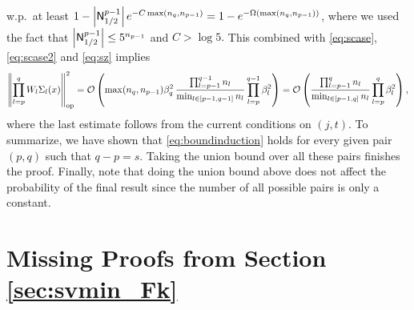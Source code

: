 \documentclass[11pt]{article}
\newcommand{\bigO}[1]{\mathcal{O}\left(#1\right)}
\newcommand{\bigOmg}[1]{\Omega\left(#1\right)}
\newcommand{\norm}[1]{\left\|#1\right\|}
\newcommand{\abs}[1]{\left|#1\right|}
\def\op{\mathrm{op}}
\def\min{\mathop{\rm min}\nolimits}
\def\max{\mathop{\rm max}\nolimits}
\begin{document}
    w.p.\ at least
	$1-\abs{{\sf N}_{1/2}^{p-1}} e^{-C\max(n_q,n_{p-1})} = 1-e^{-\bigOmg{\max(n_q,n_{p-1})}}$, 
    where we used the fact that $\abs{{\sf N}_{1/2}^{p-1}}\leq 5^{n_{p-1}}$ and $C>\log 5.$
    This combined with \eqref{eq:scase},\eqref{eq:scase2} and \eqref{eq:sz} implies
    \begin{align*}
	\norm{\prod_{l=p}^{q} W_l\Sigma_l(x)}_{\op}^2
	=\bigO{ \max(n_q,n_{p-1}) \beta_q^2 \, \frac{\prod_{l=p-1}^{q-1} n_l}{\min_{l\in[p-1,q-1]}n_l} \prod_{l=p}^{q-1}\beta_l^2 }
	=\bigO{ \frac{\prod_{l=p-1}^{q} n_l}{\min_{l\in[p-1,q]}n_l} \prod_{l=p}^{q}\beta_l^2 },
    \end{align*}
    where the last estimate follows from the current conditions on $(j,t).$
    To summarize, we have shown that \eqref{eq:boundinduction} holds for every given pair $(p,q)$ such that $q-p=s.$
    Taking the union bound over all these pairs finishes the proof. 
    Finally, note that doing the union bound above does not affect the probability of the final result
    since the number of all possible pairs is only a constant.


\section{Missing Proofs from Section \ref{sec:svmin_Fk}}
\end{document}
